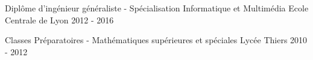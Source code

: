 

\begin{cventries}

	\cventry
	{Diplôme d'ingénieur généraliste - Spécialisation Informatique et Multimédia}
	{}
	{Ecole Centrale de Lyon}
	{}
	{2012 - 2016}
	{}
	{}

	\cventry
	{Classes Préparatoires - Mathématiques supérieures et spéciales}
	{}
	{Lycée Thiers}
	{}
	{2010 - 2012}
	{}
	{}
\end{cventries}
